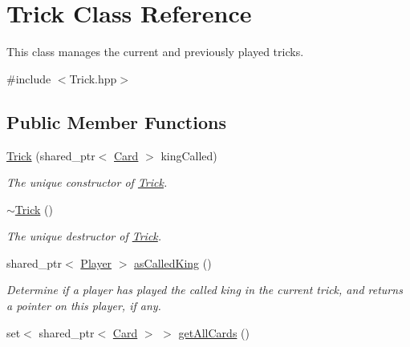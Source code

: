 \hypertarget{classTrick}{\section{\-Trick \-Class \-Reference}
\label{classTrick}
}


\-This class manages the current and previously played tricks.  




{\ttfamily \#include $<$\-Trick.\-hpp$>$}

\subsection*{\-Public \-Member \-Functions}
\begin{DoxyCompactItemize}
\item 
\hyperlink{classTrick_a2d52be4c67d65793531d2dc96122ae72}{\-Trick} (shared\-\_\-ptr$<$ \hyperlink{classCard}{\-Card} $>$ king\-Called)
\begin{DoxyCompactList}\small\item\em \-The unique constructor of \hyperlink{classTrick}{\-Trick}. \end{DoxyCompactList}\item 
\hypertarget{classTrick_a96a443338c26a142b45ba08c2f5748a1}{\hyperlink{classTrick_a96a443338c26a142b45ba08c2f5748a1}{$\sim$\-Trick} ()}\label{classTrick_a96a443338c26a142b45ba08c2f5748a1}

\begin{DoxyCompactList}\small\item\em \-The unique destructor of \hyperlink{classTrick}{\-Trick}. \end{DoxyCompactList}\item 
\hypertarget{classTrick_a3e98bee722ab6bfcbd659cb34af77202}{shared\-\_\-ptr$<$ \hyperlink{classPlayer}{\-Player} $>$ \hyperlink{classTrick_a3e98bee722ab6bfcbd659cb34af77202}{as\-Called\-King} ()}\label{classTrick_a3e98bee722ab6bfcbd659cb34af77202}

\begin{DoxyCompactList}\small\item\em \-Determine if a player has played the called king in the current trick, and returns a pointer on this player, if any. \end{DoxyCompactList}\item 
\hypertarget{classTrick_af77e35811aad04dcbd8b5c5e28a211a1}{set$<$ shared\-\_\-ptr$<$ \hyperlink{classCard}{\-Card} $>$ $>$ \hyperlink{classTrick_af77e35811aad04dcbd8b5c5e28a211a1}{get\-All\-Cards} ()}\label{classTrick_af77e35811aad04dcbd8b5c5e28a211a1}


\end{DoxyCompactItemize}
